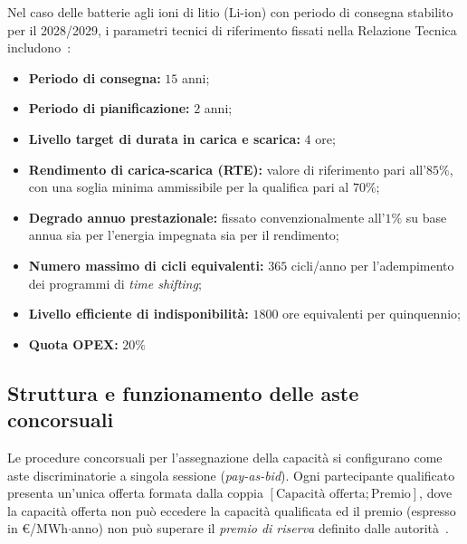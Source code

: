 Nel caso delle batterie agli ioni di litio (Li-ion) con periodo di consegna stabilito per il 2028/2029, i parametri tecnici di riferimento fissati nella Relazione Tecnica includono~\cite{terna_relazione}:
\begin{itemize}
    \item \textbf{Periodo di consegna:} $15$ anni;
    \item \textbf{Periodo di pianificazione:} $2$ anni;
    \item \textbf{Livello target di durata in carica e scarica:} $4$ ore;
    \item \textbf{Rendimento di carica-scarica (\ac{RTE}):} valore di riferimento pari all'$85\%$, con una soglia minima ammissibile per la qualifica pari al $70\%$;
    \item \textbf{Degrado annuo prestazionale:} fissato convenzionalmente all'$1\%$ su base annua sia per l'energia impegnata sia per il rendimento;
    \item \textbf{Numero massimo di cicli equivalenti:} $365$ cicli/anno per l'adempimento dei programmi di \textit{time shifting};
    \item \textbf{Livello efficiente di indisponibilità:} $1800$ ore equivalenti per quinquennio;
    \item \textbf{Quota OPEX:} $20\%$
\end{itemize}

\subsection{Struttura e funzionamento delle aste concorsuali}
Le procedure concorsuali per l'assegnazione della capacità si configurano come aste discriminatorie a singola sessione (\textit{pay-as-bid}). Ogni partecipante qualificato presenta un'unica offerta formata dalla coppia $[\text{Capacità offerta}; \text{Premio}]$, dove la capacità offerta non può eccedere la capacità qualificata ed il premio (espresso in €/MWh$\cdot$anno) non può superare il \textit{premio di riserva} definito dalle autorità~\cite{terna_disciplina}.

